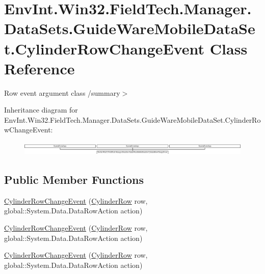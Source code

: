 \hypertarget{class_env_int_1_1_win32_1_1_field_tech_1_1_manager_1_1_data_sets_1_1_guide_ware_mobile_data_set_1_1_cylinder_row_change_event}{}\section{Env\+Int.\+Win32.\+Field\+Tech.\+Manager.\+Data\+Sets.\+Guide\+Ware\+Mobile\+Data\+Set.\+Cylinder\+Row\+Change\+Event Class Reference}
\label{class_env_int_1_1_win32_1_1_field_tech_1_1_manager_1_1_data_sets_1_1_guide_ware_mobile_data_set_1_1_cylinder_row_change_event}


Row event argument class /summary$>$  


Inheritance diagram for Env\+Int.\+Win32.\+Field\+Tech.\+Manager.\+Data\+Sets.\+Guide\+Ware\+Mobile\+Data\+Set.\+Cylinder\+Row\+Change\+Event\+:\begin{figure}[H]
\begin{center}
\leavevmode
\includegraphics[height=0.661939cm]{class_env_int_1_1_win32_1_1_field_tech_1_1_manager_1_1_data_sets_1_1_guide_ware_mobile_data_set_1_1_cylinder_row_change_event}
\end{center}
\end{figure}
\subsection*{Public Member Functions}
\begin{DoxyCompactItemize}
\item 
\hyperlink{class_env_int_1_1_win32_1_1_field_tech_1_1_manager_1_1_data_sets_1_1_guide_ware_mobile_data_set_1_1_cylinder_row_change_event_a75a38c69ad337b5c13fa447a4200e5f8}{Cylinder\+Row\+Change\+Event} (\hyperlink{class_env_int_1_1_win32_1_1_field_tech_1_1_manager_1_1_data_sets_1_1_guide_ware_mobile_data_set_1_1_cylinder_row}{Cylinder\+Row} row, global\+::\+System.\+Data.\+Data\+Row\+Action action)
\item 
\hyperlink{class_env_int_1_1_win32_1_1_field_tech_1_1_manager_1_1_data_sets_1_1_guide_ware_mobile_data_set_1_1_cylinder_row_change_event_a75a38c69ad337b5c13fa447a4200e5f8}{Cylinder\+Row\+Change\+Event} (\hyperlink{class_env_int_1_1_win32_1_1_field_tech_1_1_manager_1_1_data_sets_1_1_guide_ware_mobile_data_set_1_1_cylinder_row}{Cylinder\+Row} row, global\+::\+System.\+Data.\+Data\+Row\+Action action)
\item 
\hyperlink{class_env_int_1_1_win32_1_1_field_tech_1_1_manager_1_1_data_sets_1_1_guide_ware_mobile_data_set_1_1_cylinder_row_change_event_a75a38c69ad337b5c13fa447a4200e5f8}{Cylinder\+Row\+Change\+Event} (\hyperlink{class_env_int_1_1_win32_1_1_field_tech_1_1_manager_1_1_data_sets_1_1_guide_ware_mobile_data_set_1_1_cylinder_row}{Cylinder\+Row} row, global\+::\+System.\+Data.\+Data\+Row\+Action action)
\end{DoxyCompactItemize}
